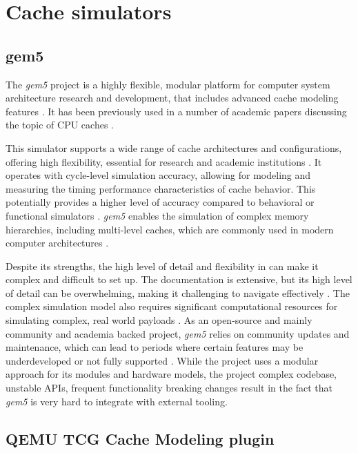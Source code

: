 \section{Cache simulators}

\subsection{gem5}

The \textit{gem5} project is a highly flexible, modular platform for computer system architecture research and development, that includes advanced cache modeling features \cite{gem5cachesupport}.
It has been previously used in a number of academic papers discussing the topic of CPU caches \cite{gem5cachecite1, gem5cachecite2, gem5cachecite3}.

This simulator supports a wide range of cache architectures and configurations, offering high flexibility, essential for research and academic institutions \cite{gem5}.
It operates with cycle-level simulation accuracy, allowing for modeling and measuring the timing performance characteristics of cache behavior. This potentially provides a higher level of accuracy
compared to behavioral or functional simulators \cite{gem5accuracy}. \textit{gem5} enables the simulation of complex memory hierarchies, including multi-level caches, which are commonly
used in modern computer architectures \cite{gem5multilevel, cachesimsurv}.

Despite its strengths, the high level of detail and flexibility in can make it complex and difficult to set up. The documentation is extensive, but its high level of detail can be overwhelming,
making it challenging to navigate effectively \cite{gem5hell}. The complex simulation model also requires significant computational resources for simulating complex, real world payloads
\cite{gem5, cachesimsurv}. As an open-source and mainly community and academia backed project, \textit{gem5} relies on community updates and maintenance, which can lead to periods where certain
features may be underdeveloped or not fully supported \cite{gem5hell, gem5maintainers}. While the project uses a modular approach for its modules and hardware models, the project complex codebase,
unstable APIs, frequent functionality breaking changes \cite{gem5hell} result in the fact that \textit{gem5} is very hard to integrate with external tooling.

\subsection{QEMU TCG Cache Modeling plugin}

